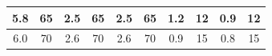 \documentclass[a4paper,12pt]{article} %
\begin{document}
\begin{center}
\begin{table}
\begin{tabular}{|c|c|c|c|c|c|c|c|c|c|}
            5.8                                        & 65                                         & 2.5                                       & 65                                         & 2.5                          & 65            & 1.2                          & 12            &  0.9  & 12    \\ \hline
            6.0                                        & 70                                         & 2.6                                       & 70                                         & 2.6                          & 70            & 0.9                          & 15            &  0.8  & 15    \\ \hline
        \end{tabular}
    \end{table}
\end{center}
\end{document}
